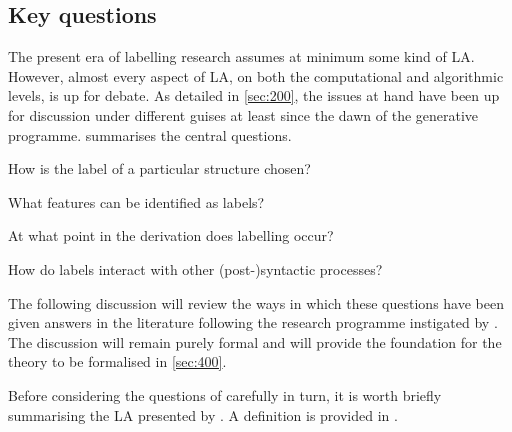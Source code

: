 \subsection{Key questions}\label{sec:310}

The present era of labelling research assumes at minimum some kind of LA. However, almost every aspect of LA, on both the computational and algorithmic levels, is up for debate. As detailed in \autoref{sec:200}, the issues at hand have been up for discussion under different guises at least since the dawn of the generative programme.  summarises the central questions.

\begin{subexamples}\label{ex:questions}
    \item\label{ex:questions:how} How is the label of a particular structure chosen?
    \item\label{ex:questions:what} What features can be identified as labels?
    \item\label{ex:questions:when} At what point in the derivation does labelling occur?
    \item\label{ex:questions:interact} How do labels interact with other (post-)syntactic processes?
\end{subexamples}
\noindent
The following discussion will review the ways in which these questions have been given answers in the literature following the research programme instigated by \textcite{ChomskyN_2013,ChomskyN_2015}. The discussion will remain purely formal and will provide the foundation for the theory to be formalised in \autoref{sec:400}.

Before considering the questions of  carefully in turn, it is worth briefly summarising the LA presented by \textcite{ChomskyN_2013,ChomskyN_2015}. A definition is provided in .

